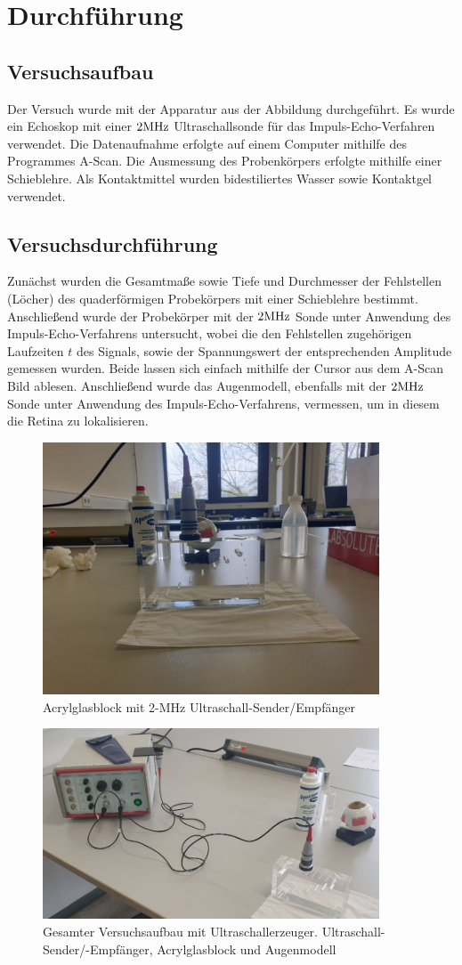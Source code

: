 \section{Durchführung}
\label{sec:durchfuehrung}
\subsection{Versuchsaufbau}
Der Versuch wurde mit der Apparatur aus der Abbildung durchgeführt. Es wurde ein Echoskop mit einer $2\si[]{MHz}$ Ultraschallsonde für das Impuls-Echo-Verfahren verwendet.
Die Datenaufnahme erfolgte auf einem Computer mithilfe des Programmes A-Scan. Die Ausmessung des Probenkörpers erfolgte mithilfe einer Schieblehre. Als Kontaktmittel wurden bidestiliertes Wasser sowie Kontaktgel verwendet.
\subsection{Versuchsdurchführung}
Zunächst wurden die Gesamtmaße sowie Tiefe und Durchmesser der Fehlstellen (Löcher) des quaderförmigen Probekörpers mit einer Schieblehre bestimmt.
Anschließend wurde der Probekörper mit der $2\si[]{MHz}$ Sonde unter Anwendung des Impuls-Echo-Verfahrens untersucht, wobei die den Fehlstellen zugehörigen Laufzeiten $t$ des Signals, sowie der Spannungswert der entsprechenden Amplitude gemessen wurden. Beide lassen sich einfach mithilfe der Cursor aus dem A-Scan Bild ablesen.
Anschließend wurde das Augenmodell, ebenfalls mit der $2\si[]{MHz}$ Sonde unter Anwendung des Impuls-Echo-Verfahrens, vermessen, um in diesem die Retina zu lokalisieren.

  \begin{figure}[h]
    \label{fig:block}
    \centering
    \includegraphics[width=10cm]{Block}
    \caption{Acrylglasblock mit 2-MHz Ultraschall-Sender/Empfänger}
\end{figure}


  \begin{figure}[h]
    \label{fig:aufbau}
    \centering
    \includegraphics[width=10cm]{Aufbau}
    \caption{Gesamter Versuchsaufbau mit Ultraschallerzeuger. Ultraschall-Sender/-Empfänger, Acrylglasblock und Augenmodell}
\end{figure}
